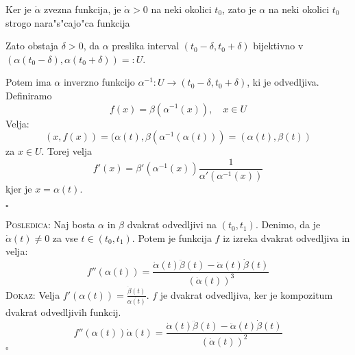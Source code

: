 Ker je $\dot{\alpha}$ zvezna funkcija, je $\dot{\alpha} > 0$ na neki okolici $t_0$, zato je $\alpha$ na neki okolici $t_0$ strogo nara"s"cajo"ca funkcija

Zato obstaja $\delta > 0$, da $\alpha$ preslika interval $(t_0 - \delta, t_0 + \delta)$ bijektivno v $(\alpha(t_0 - \delta), \alpha(t_0 + \delta)) =: U$.

Potem ima $\alpha$ inverzno funkcijo $\alpha^{-1}: U \to (t_0 - \delta, t_0 + \delta)$, ki je odvedljiva. Definiramo
\begin{equation*}
f(x) = \beta(\alpha^{-1}(x)), \quad x \in U
\end{equation*}
Velja:
\begin{equation*}
(x, f(x)) = (\alpha(t), \beta(\alpha^{-1}(\alpha(t))) = (\alpha(t), \beta(t))
\end{equation*}
za $x \in U$. Torej velja
\begin{equation*}
f'(x) = \beta'(\alpha^{-1}(x)) \dfrac{1}{\alpha'(\alpha^{-1}(x))}
\end{equation*}
kjer je $x = \alpha(t)$.

\hfill $\square$

\textsc{Posledica:} Naj bosta $\alpha$ in $\beta$ dvakrat odvedljivi na $(t_0, t_1)$. Denimo, da je $\dot{\alpha}(t) \neq 0$ za vse $t \in (t_0, t_1)$. Potem je funkcija $f$ iz izreka dvakrat odvedljiva in velja:
\begin{equation*}
f''(\alpha(t)) = \dfrac{\dot{\alpha}(t)\ddot{\beta}(t) - \ddot{\alpha}(t)\dot{\beta}(t)}{(\dot{\alpha}(t))^3}
\end{equation*}
\textsc{Dokaz:} Velja $f'(\alpha(t)) = \frac{\dot{\beta}(t)}{\dot{\alpha(t)}}$. $f$ je dvakrat odvedljiva, ker je kompozitum dvakrat odvedljivih funkcij.
\begin{equation*}
f''(\alpha(t)) \dot{\alpha}(t) = \dfrac{\dot{\alpha}(t)\ddot{\beta}(t) - \ddot{\alpha}(t)\dot{\beta}(t)}{(\dot{\alpha}(t))^2}
\end{equation*}
\hfill $\square$

